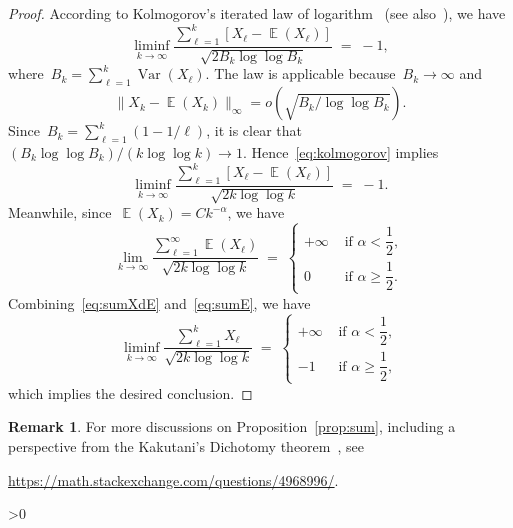 \documentclass[12pt,a4paper]{article}  %
\newcommand{\bibfile}{\jobname.bib}  %
\newcounter{cite}
\theoremstyle{definition}
\newtheorem{remark}{Remark}[section]
\numberwithin{equation}{section}
\DeclareMathOperator{\var}{Var}
\DeclareMathOperator{\expc}{\mathbb{E}}
\begin{document}
\begin{proof}
According to Kolmogorov's iterated law of logarithm~\cite{Kolmogoroff_1929} (see
also~\cite[Theorems~7.1--7.3]{Petrov_1995}), we have
\begin{equation}
    \label{eq:kolmogorov}
    \liminf_{k\to\infty} \frac{\sum_{\ell=1}^k [X_\ell -\expc(X_\ell)]}{\sqrt{2B_k\log\log B_k}} \; =\; -1,
\end{equation}
where~$B_k = \sum_{\ell=1}^k \var(X_\ell)$. The law is applicable because~$B_k\to \infty$
and
\[
\|X_k-\expc(X_k)\|_\infty = o(\sqrt{B_k/\log\log B_k}).
\]
Since~$B_k = \sum_{\ell=1}^k (1-1/\ell)$, it is clear that~$(B_k \log\log B_k)/(k\log\log k) \to 1$.
Hence~\eqref{eq:kolmogorov} implies
\begin{equation}
    \label{eq:sumXdE}
    \liminf_{k\to\infty} \frac{\sum_{\ell=1}^k [X_\ell -\expc(X_\ell)]}{\sqrt{2k\log\log k}} \; =\; -1.
\end{equation}
Meanwhile, since~$\expc(X_k) = Ck^{-\alpha}$, we have
\begin{equation}
    \label{eq:sumE}
    \lim_{k\to \infty} \frac{\sum_{\ell=1}^\infty \expc(X_\ell)}{\sqrt{2k\log\log k}} \;=\;
    \begin{cases}
        +\infty & \text{ if } \alpha < \dfrac{1}{2}, \\[2ex]
        0 & \text{ if } \alpha \ge \dfrac{1}{2}.
    \end{cases}
\end{equation}
Combining~\eqref{eq:sumXdE} and~\eqref{eq:sumE}, we have
\[
    \liminf_{k\to\infty} \frac{\sum_{\ell=1}^k X_\ell}{\sqrt{2k\log\log k}} \; =\;
    \begin{cases}
        +\infty & \text{ if } \alpha < \dfrac{1}{2}, \\[2ex]
        -1 & \text{ if } \alpha \ge \dfrac{1}{2},
    \end{cases}
    \]
    which implies the desired conclusion.
\end{proof}

\begin{remark}
    \label{rem:ms}
    For more discussions on Proposition~\ref{prop:sum}, including a perspective from the
    Kakutani's Dichotomy theorem~\cite{Kakutani_1948}, see
    \begin{center}
        \url{https://math.stackexchange.com/questions/4968996/}.
    \end{center}
\end{remark}



\ifnum\value{cite}>0
    \small
    
    
\fi

\end{document}
